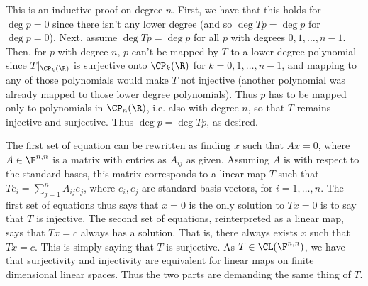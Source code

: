 \documentclass{book}
\begin{document}
\begin{enumerate}[label=\arabic*)]
\begin{enumerate}[label=\alph*)]
        \ii This is an inductive proof on degree $n$. First, we have that this holds for $\deg p = 0$ since there isn't any lower degree (and so $\deg Tp = \deg p$ for $\deg p = 0$). Next,
        assume $\deg Tp = \deg p$ for all $p$ with degrees $0, 1, \dots, n - 1$. Then, for $p$ with degree $n$, $p$ can't be mapped by $T$ to a lower degree polynomial since $T|_{\CP_k(\R)}$
        is surjective onto $\CP_k(\R)$ for $k = 0, 1, \dots, n - 1$, and mapping to any of those polynomials would make $T$ not injective (another polynomial was already mapped to those
        lower degree polynomials). Thus $p$ has to be mapped only to polynomials in $\CP_n(\R)$, i.e. also with degree $n$, so that $T$ remains injective and surjective. Thus $\deg p = \deg
        Tp$, as desired.
      \end{enumerate}
    \ii
      The first set of equation can be rewritten as finding $x$ such that $Ax = 0$, where $A \in \F^{n, n}$ is a matrix with entries as $A_{ij}$ as given. Assuming $A$ is with respect to the
      standard bases, this matrix corresponds to a linear map $T$ such that $Te_i = \sum_{j = 1}^{n}A_{ij}e_j$, where $e_i, e_j$ are standard basis vectors, for $i = 1, \dots, n$. The first
      set of equations thus says that $x = 0$ is the only solution to $Tx = 0$ is to say that $T$ is injective. The second set of equations, reinterpreted as a linear map, says that $Tx = c$
      always has a solution. That is, there always exists $x$ such that $Tx = c$. This is simply saying that $T$ is surjective. As $T \in \CL(\F^{n, n})$, we have that surjectivity and
      injectivity are equivalent for linear maps on finite dimensional linear spaces. Thus the two parts are demanding the same thing of $T$.
  \end{enumerate}
\end{document}
